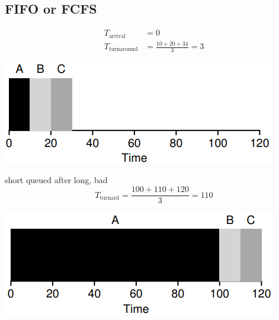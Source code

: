 \documentclass[8pt,a4paper,landscape]{extarticle}
\begin{document}
\begin{multicols*}{3}
\begin{minipage}{.5\linewidth}
\section*{FIFO or FCFS}
\begin{align*}
  T_{\text{arrival}}    & = 0 \\
  T_{\text{turnaround}} & = \frac{10+20+34}{3} = 3
\end{align*}
\end{minipage}
\begin{minipage}{.5\linewidth}
  \includegraphics[width=\linewidth]{imgs/sched_fifo1}
\end{minipage}
\begin{minipage}{.5\linewidth}
short queued after long, bad
\begin{equation*}
  T_{\text{turnard}} = \frac{100+110+120}{3} = 110
\end{equation*}
\end{minipage}
\begin{minipage}{.5\linewidth}
  \includegraphics[width=\linewidth]{imgs/sched_fifo2}
\end{minipage}
\begin{minipage}{.5\linewidth}

\end{minipage}
\end{multicols*}
\end{document}

